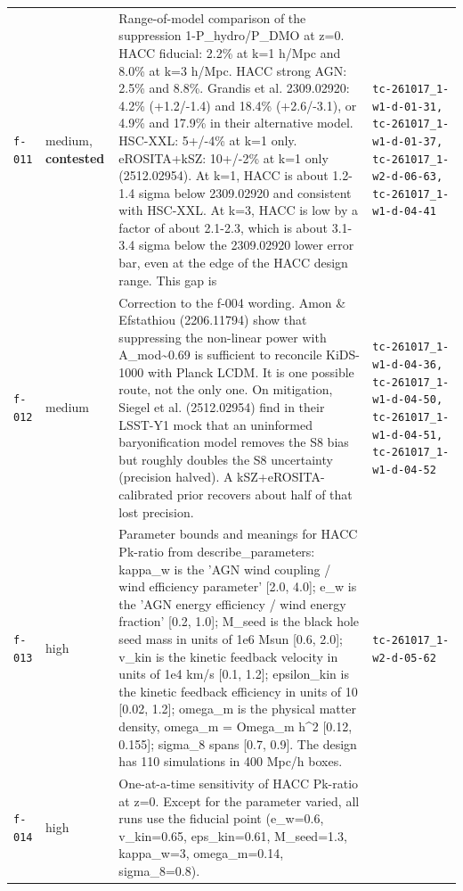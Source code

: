 \documentclass[11pt,a4paper]{article}
\begin{document}
\begin{longtable}{@{}p{}p{}p{}p{}@{}}
\texttt{f-011} & medium, \textbf{contested} & Range-of-model comparison of the suppression 1-P\_hydro/P\_DMO at z=0. HACC fiducial: 2.2\% at k=1 h/Mpc and 8.0\% at k=3 h/Mpc. HACC strong AGN: 2.5\% and 8.8\%. Grandis et al. 2309.02920: 4.2\% (+1.2/-1.4) and 18.4\% (+2.6/-3.1), or 4.9\% and 17.9\% in their alternative model. HSC-XXL: 5+/-4\% at k=1 only. eROSITA+kSZ: 10+/-2\% at k=1 only (2512.02954). At k=1, HACC is about 1.2-1.4 sigma below 2309.02920 and consistent with HSC-XXL. At k=3, HACC is low by a factor of about 2.1-2.3, which is about 3.1-3.4 sigma below the 2309.02920 lower error bar, even at the edge of the HACC design range. This gap is  & \texttt{tc-261017\_\allowbreak{}1-w1-d-01-31,\allowbreak{} tc-261017\_\allowbreak{}1-w1-d-01-37,\allowbreak{} tc-261017\_\allowbreak{}1-w2-d-06-63,\allowbreak{} tc-261017\_\allowbreak{}1-w1-d-04-41} \\
\texttt{f-012} & medium & Correction to the f-004 wording. Amon \& Efstathiou (2206.11794) show that suppressing the non-linear power with A\_mod\textasciitilde{}0.69 is sufficient to reconcile KiDS-1000 with Planck LCDM. It is one possible route, not the only one. On mitigation, Siegel et al. (2512.02954) find in their LSST-Y1 mock that an uninformed baryonification model removes the S8 bias but roughly doubles the S8 uncertainty (precision halved). A kSZ+eROSITA-calibrated prior recovers about half of that lost precision. & \texttt{tc-261017\_\allowbreak{}1-w1-d-04-36,\allowbreak{} tc-261017\_\allowbreak{}1-w1-d-04-50,\allowbreak{} tc-261017\_\allowbreak{}1-w1-d-04-51,\allowbreak{} tc-261017\_\allowbreak{}1-w1-d-04-52} \\
\texttt{f-013} & high & Parameter bounds and meanings for HACC Pk-ratio from describe\_parameters: kappa\_w is the 'AGN wind coupling / wind efficiency parameter' [2.0, 4.0]; e\_w is the 'AGN energy efficiency / wind energy fraction' [0.2, 1.0]; M\_seed is the black hole seed mass in units of 1e6 Msun [0.6, 2.0]; v\_kin is the kinetic feedback velocity in units of 1e4 km/s [0.1, 1.2]; epsilon\_kin is the kinetic feedback efficiency in units of 10 [0.02, 1.2]; omega\_m is the physical matter density, omega\_m = Omega\_m h\textasciicircum{}2 [0.12, 0.155]; sigma\_8 spans [0.7, 0.9]. The design has 110 simulations in 400 Mpc/h boxes. & \texttt{tc-261017\_\allowbreak{}1-w2-d-05-62} \\
\texttt{f-014} & high & One-at-a-time sensitivity of HACC Pk-ratio at z=0. Except for the parameter varied, all runs use the fiducial point (e\_w=0.6, v\_kin=0.65, eps\_kin=0.61, M\_seed=1.3, kappa\_w=3, omega\_m=0.14, sigma\_8=0.8).

\end{longtable}
\end{document}
